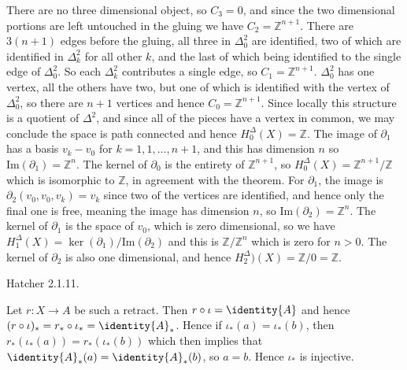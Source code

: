     \begin{solution}
        There are no three dimensional object, so $C_{3}=0$, and since the two
        dimensional portions are left untouched in the gluing we have
        $C_{2}=\mathbb{Z}^{n+1}$. There are $3(n+1)$ edges before the gluing,
        all three in $\Delta_{0}^{2}$ are identified, two of which are
        identified in $\Delta_{k}^{2}$ for all other $k$, and the last of which
        being identified to the single edge of $\Delta_{0}^{2}$. So each
        $\Delta_{k}^{2}$ contributes a single edge, so $C_{1}=\mathbb{Z}^{n+1}$.
        $\Delta_{0}^{2}$ has one vertex, all the others have two, but one of
        which is identified with the vertex of $\Delta_{0}^{2}$, so there are
        $n+1$ vertices and hence $C_{0}=\mathbb{Z}^{n+1}$. Since locally this
        structure is a quotient of $\Delta^{2}$, and since all of the pieces
        have a vertex in common, we may conclude the space is path connected and
        hence $H_{0}^{\Delta}(X)=\mathbb{Z}$. The image of $\partial_{1}$ has a
        basis $v_{k}-v_{0}$ for $k=1,1,\dots,n+1$, and this has dimension $n$
        so $\textrm{Im}(\partial_{1})=\mathbb{Z}^{n}$. The kernel of
        $\partial_{0}$ is the entirety of $\mathbb{Z}^{n+1}$, so
        $H_{0}^{\Delta}(X)=\mathbb{Z}^{n+1}/\mathbb{Z}$ which is isomorphic to
        $\mathbb{Z}$, in agreement with the theorem. For $\partial_{1}$, the
        image is $\partial_{2}(v_{0},v_{0},v_{k})=v_{k}$ since two of the
        vertices are identified, and hence only the final one is free, meaning
        the image has dimension $n$, so
        $\textrm{Im}(\partial_{2})=\mathbb{Z}^{n}$. The kernel of
        $\partial_{1}$ is the space of $v_{0}$, which is zero dimensional, so we
        have $H_{1}^{\Delta}(X)=\ker(\partial_{1})/\textrm{Im}(\partial_{2})$
        and this is $\mathbb{Z}/\mathbb{Z}^{n}$ which is zero for $n>0$. The
        kernel of $\partial_{2}$ is also one dimensional, and hence
        $H_{2}^{\Delta})(X)=\mathbb{Z}/0=\mathbb{Z}$.
    \end{solution}
    \begin{problem}
        Hatcher 2.1.11.
    \end{problem}
    \begin{solution}
        Let $r:X\rightarrow{A}$ be such a retract. Then
        $r\circ\iota=\identity{A}$ and hence
        $(r\circ\iota)_{*}=r_{*}\circ\iota_{*}={\identity{A}}_{*}$. Hence if
        $\iota_{*}(a)=\iota_{*}(b)$, then
        $r_{*}(\iota_{*}(a))=r_{*}(\iota_{*}(b))$ which then implies that
        ${\identity{A}}_{*}(a)={\identity{A}}_{*}(b)$, so $a=b$. Hence
        $\iota_{*}$ is injective.
    \end{solution}
